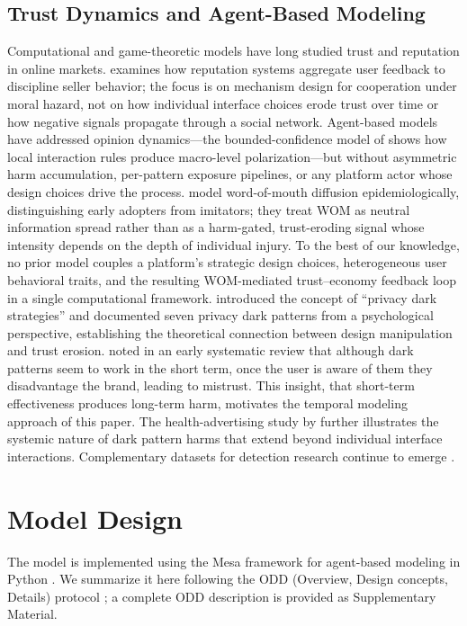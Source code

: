 \documentclass[a4paper]{article}
\begin{document}
\subsection{Trust Dynamics and Agent-Based Modeling}
Computational and game-theoretic models have long studied trust and reputation in online markets. \citet{dellarocas2006} examines how reputation systems aggregate user feedback to discipline seller behavior; the focus is on mechanism design for cooperation under moral hazard, not on how individual interface choices erode trust over time or how negative signals propagate through a social network. Agent-based models have addressed opinion dynamics---the bounded-confidence model of \citet{deffuant2000} shows how local interaction rules produce macro-level polarization---but without asymmetric harm accumulation, per-pattern exposure pipelines, or any platform actor whose design choices drive the process. \citet{goldenberg2001} model word-of-mouth diffusion epidemiologically, distinguishing early adopters from imitators; they treat WOM as neutral information spread rather than as a harm-gated, trust-eroding signal whose intensity depends on the depth of individual injury. To the best of our knowledge, no prior model couples a platform's strategic design choices, heterogeneous user behavioral traits, and the resulting WOM-mediated trust--economy feedback loop in a single computational framework. \citet{bosch2016} introduced the concept of ``privacy dark strategies'' and documented seven privacy dark patterns from a psychological perspective, establishing the theoretical connection between design manipulation and trust erosion. \citet{cara2019} noted in an early systematic review that although dark patterns seem to work in the short term, once the user is aware of them they disadvantage the brand, leading to mistrust. This insight, that short-term effectiveness produces long-term harm, motivates the temporal modeling approach of this paper. The health-advertising study by \citet{downing2022} further illustrates the systemic nature of dark pattern harms that extend beyond individual interface interactions. Complementary datasets for detection research continue to emerge \citep{yada2022}.

\section{Model Design}
\label{sec:model}
The model is implemented using the Mesa framework for agent-based modeling in Python \citep{mesa2024}. We summarize it here following the ODD (Overview, Design concepts, Details) protocol \citep{grimm2020}; a complete ODD description is provided as Supplementary Material.
\end{document}

